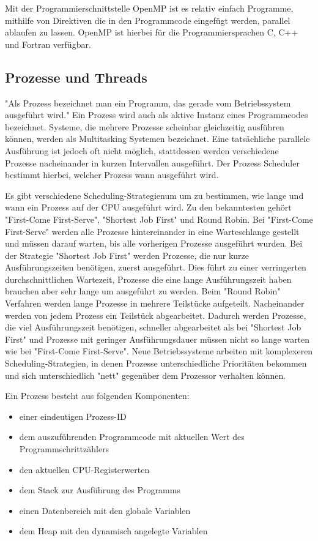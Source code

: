 \documentclass[../main.tex]{subfiles}
\begin{document}
Mit der Programmierschnittstelle OpenMP ist es relativ einfach Programme, mithilfe von Direktiven die in den Programmcode eingefügt werden, parallel ablaufen zu lassen. OpenMP ist hierbei für die Programmiersprachen C, C++ und Fortran verfügbar.

\subsection{Prozesse und Threads}

"Als Prozess bezeichnet man ein Programm, das gerade vom Betriebssystem ausgeführt wird." \cite{articleOpenMP} Ein Prozess wird auch als aktive Instanz eines Programmcodes bezeichnet. Systeme, die mehrere Prozesse scheinbar gleichzeitig ausführen können, werden als Multitasking Systemen bezeichnet. Eine tatsächliche parallele Ausführung ist jedoch oft nicht möglich, stattdessen werden verschiedene Prozesse nacheinander in kurzen Intervallen ausgeführt. Der Prozess Scheduler bestimmt hierbei, welcher Prozess wann ausgeführt wird. \par
Es gibt verschiedene Scheduling-Strategienum um zu bestimmen, wie lange und wann ein Prozess auf der CPU ausgeführt wird. Zu den bekanntesten gehört "First-Come First-Serve", "Shortest Job First" und Round Robin. Bei "First-Come First-Serve" werden alle Prozesse hintereinander in eine Warteschlange gestellt und müssen darauf warten, bis alle vorherigen Prozesse ausgeführt wurden.  Bei der Strategie "Shortest Job First" werden Prozesse, die nur kurze Ausführungszeiten benötigen, zuerst ausgeführt. Dies führt zu einer verringerten durchschnittlichen Wartezeit, Prozesse die eine lange Ausführungszeit haben brauchen aber sehr lange um ausgeführt zu werden.
Beim "Round Robin" Verfahren werden lange Prozesse in mehrere Teilstücke aufgeteilt. Nacheinander werden von jedem Prozess ein Teilstück abgearbeitet. Dadurch werden Prozesse, die viel Ausführungszeit benötigen, schneller abgearbeitet als bei "Shortest Job First" und Prozesse mit geringer Ausführungsdauer müssen nicht so lange warten wie bei "First-Come First-Serve". 
Neue Betriebssysteme arbeiten mit komplexeren Scheduling-Strategien, in denen Prozesse unterschiedliche Prioritäten bekommen und sich unterschiedlich "nett" gegenüber dem Prozessor verhalten können. \cite{scriptProzessScheduling}

Ein Prozess besteht aus folgenden Komponenten:
\begin{itemize}
	\item einer eindeutigen Prozess-ID
	\item dem auszuführenden Programmcode mit aktuellen Wert des Programmschrittzählers
	\item den aktuellen CPU-Registerwerten
	\item dem Stack zur Ausführung des Programms
	\item einen Datenbereich mit den globale Variablen
	\item dem Heap mit den dynamisch angelegte Variablen
\end{itemize} \cite{articleOpenMP}
\end{document}
